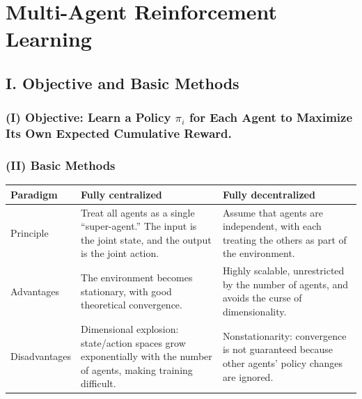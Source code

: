 \setcounter{section}{3}

\hypertarget{multi-agent-reinforcement-learning}{%
\section{Multi-Agent Reinforcement Learning}\label{multi-agent-reinforcement-learning}}

\hypertarget{i.-objective-and-basic-methods}{%
\subsection{I. Objective and Basic Methods}\label{i.-objective-and-basic-methods}}

\hypertarget{i-objective-learn-a-policy-pi_i-for-each-agent-to-maximize-its-own-expected-cumulative-reward.}{%
\subsubsection{\texorpdfstring{(I) Objective: Learn a Policy \(\pi_i\) for Each Agent to Maximize Its Own Expected Cumulative Reward.}{(I) Objective: Learn a Policy \textbackslash pi\_i for Each Agent to Maximize Its Own Expected Cumulative Reward.}}\label{i-objective-learn-a-policy-pi_i-for-each-agent-to-maximize-its-own-expected-cumulative-reward.}}

\hypertarget{ii-basic-methods}{%
\subsubsection{(II) Basic Methods}\label{ii-basic-methods}}

\begin{longtable}[]{@{}
  >{\raggedright\arraybackslash}p{}
  >{\raggedright\arraybackslash}p{}
  >{\raggedright\arraybackslash}p{}@{}}
\toprule
Paradigm & Fully centralized & Fully decentralized \\
\midrule
\endhead
Principle & Treat all agents as a single ``super-agent.'' The input is the joint state, and the output is the joint action. & Assume that agents are independent, with each treating the others as part of the environment. \\
Advantages & The environment becomes stationary, with good theoretical convergence. & Highly scalable, unrestricted by the number of agents, and avoids the curse of dimensionality. \\
Disadvantages & Dimensional explosion: state/action spaces grow exponentially with the number of agents, making training difficult. & Nonstationarity: convergence is not guaranteed because other agents' policy changes are ignored. \\
\bottomrule
\end{longtable}

